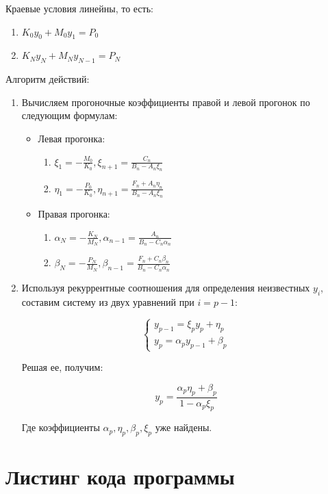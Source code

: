 \documentclass[a4paper,12pt]{article}
\begin{document}
	Краевые условия линейны, то есть:
	
	\begin{enumerate}
		\item $K_0 y_0 + M_0 y_1 = P_0$
		\item $K_N y_N + M_N y_{N - 1} = P_N$
	\end{enumerate}
	
	
	Алгоритм действий:
	
	\begin{enumerate}
		\item Вычисляем прогоночные коэффициенты правой и левой прогонок по следующим формулам:
		\begin{itemize}
			\item Левая прогонка:
			\begin{enumerate}
				\item $\xi_1 = -\frac{M_0}{K_0}, \xi_{n+1} = \frac{C_n}{B_n-A_n \xi_n}$
				\item $\eta_1 = -\frac{P_0}{K_0}, \eta_{n+1} = \frac{F_n + A_n \eta_n}{B_n-A_n \xi_n}$
			\end{enumerate}
			\item Правая прогонка:
			\begin{enumerate}
				\item $\alpha_N = -\frac{K_N}{M_N}, \alpha_{n-1} = \frac{A_n}{B_n-C_n \alpha_n}$
				\item $\beta_N = -\frac{P_N}{M_N}, \beta_{n-1} = \frac{F_n + C_n \beta_n}{B_n-C_n \alpha_n}$
			\end{enumerate}
		\end{itemize}
		\item Используя рекуррентные соотношения для определения неизвестных $y_i$, составим систему из двух уравнений при $i = p-1$:
		
		\[
		\begin{cases}
		y_{p-1} = \xi_{p} y_{p}+\eta_{p}\\
		y_{p} = \alpha_p y_{p-1} + \beta_{p}
		\end{cases}
		\]
		
		Решая ее, получим:
		
		\[
		y_p = \frac{\alpha_p \eta_p + \beta_p}{1-\alpha_p \xi_p}
		\]
		
		Где коэффициенты $\alpha_p, \eta_p, \beta_p, \xi_p$ уже найдены.
	\end{enumerate}

	\newpage
	
	\section*{Листинг кода программы}
	
\end{document}
